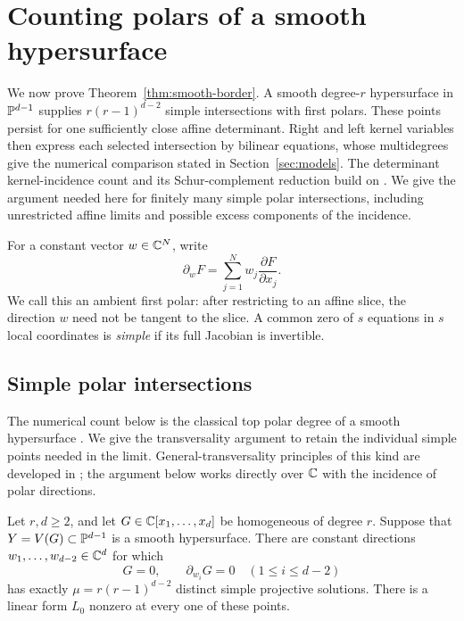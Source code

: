 \section{Counting polars of a smooth hypersurface}\label{sec:polar}

We now prove Theorem~\ref{thm:smooth-border}. A smooth degree-$r$
hypersurface in $\mathbb P^{d-1}$ supplies $r(r-1)^{d-2}$ simple intersections
with first polars. These points persist for one sufficiently close affine
determinant. Right and left kernel variables then express each selected
intersection by bilinear equations, whose multidegrees give the numerical
comparison stated in Section~\ref{sec:models}. The determinant kernel-incidence
count and its Schur-complement reduction
build on \cite[Theorem~3 and Section~3.1]{SheshadriBorder2026}. We give the
argument needed here for finitely many simple polar intersections,
including unrestricted affine limits and possible excess components of
the incidence.

For a constant vector $w\in\mathbb C^N$, write
\[
 \partial_w F=\sum_{j=1}^N w_j\frac{\partial F}{\partial x_j}.
\]
We call this an ambient first polar: after restricting to an affine slice,
the direction $w$ need not be tangent to the slice. A common zero of $s$
equations in $s$ local coordinates is \emph{simple} if its full Jacobian
is invertible.

\subsection{Simple polar intersections}

The numerical count below is the classical top polar degree of a smooth
hypersurface \cite[Corollary~3.7]{Piene1978}. We give the transversality
argument to retain the individual simple points needed in the limit.
General-transversality principles of this kind are developed in
\cite[Corollary~5]{Kleiman1974}; the argument below works directly over
$\mathbb C$ with the incidence of polar directions.

\begin{lemma}\label{polar:simple-points}
Let $r,d\ge2$, and let $G\in\mathbb C[x_1,\ldots,x_d]$ be homogeneous of degree
$r$. Suppose that $Y=V(G)\subset\mathbb P^{d-1}$ is a smooth hypersurface.
There are constant directions $w_1,\ldots,w_{d-2}\in\mathbb C^d$ for which
\begin{equation}\label{polar:projective-certificate}
 G=0,\qquad \partial_{w_i}G=0\quad(1\le i\le d-2)
\end{equation}
has exactly $\mu=r(r-1)^{d-2}$ distinct simple projective solutions.
There is a linear form $L_0$ nonzero at every one of these points.
\end{lemma}

